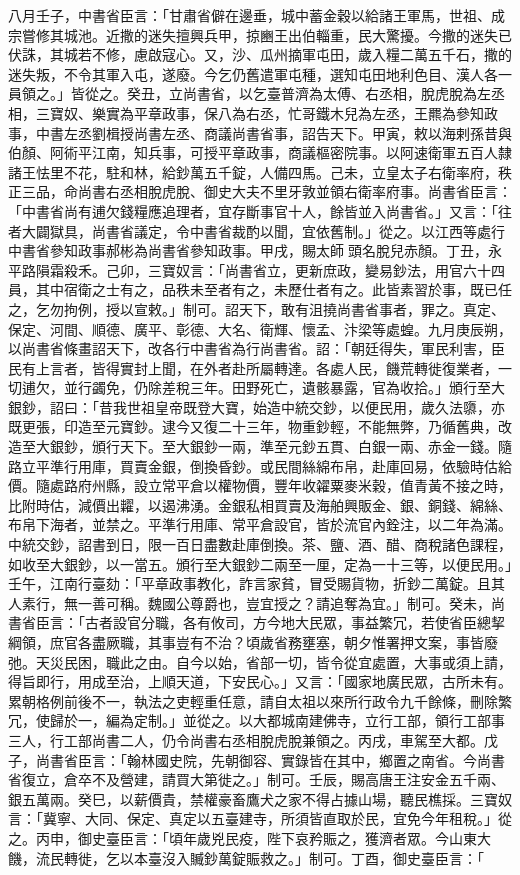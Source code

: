 \begin{pinyinscope}
 八月壬子，中書省臣言：「甘肅省僻在邊垂，城中蓄金穀以給諸王軍馬，世祖、成宗嘗修其城池。近撒的迷失擅興兵甲，掠豳王出伯輜重，民大驚擾。今撒的迷失已伏誅，其城若不修，慮啟寇心。又，沙、瓜州摘軍屯田，歲入糧二萬五千石，撒的迷失叛，不令其軍入屯，遂廢。今乞仍舊遣軍屯種，選知屯田地利色目、漢人各一員領之。」皆從之。癸丑，立尚書省，以乞臺普濟為太傅、右丞相，脫虎脫為左丞相，三寶奴、樂實為平章政事，保八為右丞，忙哥鐵木兒為左丞，王羆為參知政事，中書左丞劉楫授尚書左丞、商議尚書省事，詔告天下。甲寅，敕以海剌孫昔與伯顏、阿術平江南，知兵事，可授平章政事，商議樞密院事。以阿速衛軍五百人隸諸王怯里不花，駐和林，給鈔萬五千錠，人備四馬。己未，立皇太子右衛率府，秩正三品，命尚書右丞相脫虎脫、御史大夫不里牙敦並領右衛率府事。尚書省臣言：「中書省尚有逋欠錢糧應追理者，宜存斷事官十人，餘皆並入尚書省。」又言：「往者大闢獄具，尚書省議定，令中書省裁酌以聞，宜依舊制。」從之。以江西等處行中書省參知政事郝彬為尚書省參知政事。甲戌，賜太師頭名脫兒赤顏。丁丑，永平路隕霜殺禾。己卯，三寶奴言：「尚書省立，更新庶政，變易鈔法，用官六十四員，其中宿衛之士有之，品秩未至者有之，未歷仕者有之。此皆素習於事，既已任之，乞勿拘例，授以宣敕。」制可。詔天下，敢有沮撓尚書省事者，罪之。真定、保定、河間、順德、廣平、彰德、大名、衛輝、懷孟、汴梁等處蝗。九月庚辰朔，以尚書省條畫詔天下，改各行中書省為行尚書省。詔：「朝廷得失，軍民利害，臣民有上言者，皆得實封上聞，在外者赴所屬轉達。各處人民，饑荒轉徙復業者，一切逋欠，並行蠲免，仍除差稅三年。田野死亡，遺骸暴露，官為收拾。」頒行至大銀鈔，詔曰：「昔我世祖皇帝既登大寶，始造中統交鈔，以便民用，歲久法隳，亦既更張，印造至元寶鈔。逮今又復二十三年，物重鈔輕，不能無弊，乃循舊典，改造至大銀鈔，頒行天下。至大銀鈔一兩，準至元鈔五貫、白銀一兩、赤金一錢。隨路立平準行用庫，買賣金銀，倒換昏鈔。或民間絲綿布帛，赴庫回易，依驗時估給價。隨處路府州縣，設立常平倉以權物價，豐年收糴粟麥米穀，值青黃不接之時，比附時估，減價出糶，以遏沸湧。金銀私相買賣及海舶興販金、銀、銅錢、綿絲、布帛下海者，並禁之。平準行用庫、常平倉設官，皆於流官內銓注，以二年為滿。中統交鈔，詔書到日，限一百日盡數赴庫倒換。茶、鹽、酒、醋、商稅諸色課程，如收至大銀鈔，以一當五。頒行至大銀鈔二兩至一厘，定為一十三等，以便民用。」壬午，江南行臺劾：「平章政事教化，詐言家貧，冒受賜貨物，折鈔二萬錠。且其人素行，無一善可稱。魏國公尊爵也，豈宜授之？請追奪為宜。」制可。癸未，尚書省臣言：「古者設官分職，各有攸司，方今地大民眾，事益繁冗，若使省臣總挈綱領，庶官各盡厥職，其事豈有不治？頃歲省務壅塞，朝夕惟署押文案，事皆廢弛。天災民困，職此之由。自今以始，省部一切，皆令從宜處置，大事或須上請，得旨即行，用成至治，上順天道，下安民心。」又言：「國家地廣民眾，古所未有。累朝格例前後不一，執法之吏輕重任意，請自太祖以來所行政令九千餘條，刪除繁冗，使歸於一，編為定制。」並從之。以大都城南建佛寺，立行工部，領行工部事三人，行工部尚書二人，仍令尚書右丞相脫虎脫兼領之。丙戌，車駕至大都。戊子，尚書省臣言：「翰林國史院，先朝御容、實錄皆在其中，鄉置之南省。今尚書省復立，倉卒不及營建，請買大第徙之。」制可。壬辰，賜高唐王注安金五千兩、銀五萬兩。癸巳，以薪價貴，禁權豪畜鷹犬之家不得占據山場，聽民樵採。三寶奴言：「冀寧、大同、保定、真定以五臺建寺，所須皆直取於民，宜免今年租稅。」從之。丙申，御史臺臣言：「頃年歲兇民疫，陛下哀矜賑之，獲濟者眾。今山東大饑，流民轉徙，乞以本臺沒入贓鈔萬錠賑救之。」制可。丁酉，御史臺臣言：「
\end{pinyinscope}
